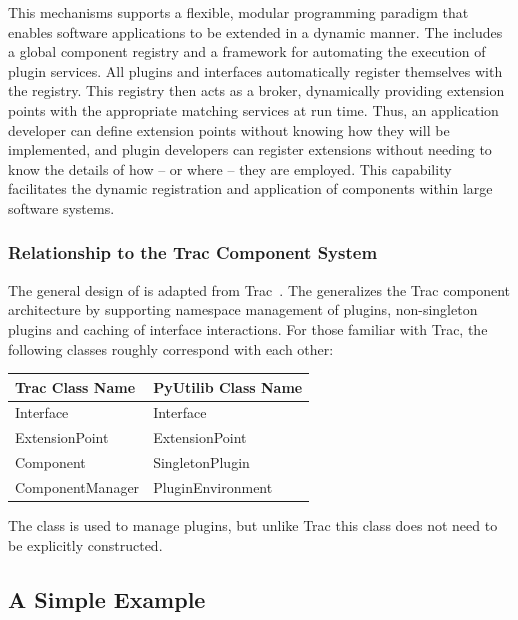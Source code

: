 This mechanisms supports a flexible,
modular programming paradigm that enables software applications to
be extended in a dynamic manner.  The \pcasp includes a global component
registry and a framework for automating the execution of plugin
services.  All plugins and interfaces automatically register themselves
with the registry.  This registry then acts as a broker, dynamically providing
extension points with the appropriate matching services at run time.  
Thus, an application
developer can define extension points without knowing how they will be
implemented, and plugin developers can register extensions without
needing to know the details of how -- or where -- they are employed.
This capability facilitates the dynamic registration
and application of components within large software systems.

\subsubsection{Relationship to the Trac Component System}

The general design of \pcasp is adapted from Trac~\cite{Trac}. The \pcasp
generalizes the Trac component architecture by supporting namespace
management of plugins, non-singleton plugins and caching of interface interactions. For those
familiar with Trac, the following classes roughly correspond with
each other:
\begin{center}
\begin{tabular}{|l|l|} \hline
    Trac Class Name &   PyUtilib Class Name \\ \hline
    Interface   & Interface \\
    ExtensionPoint  & ExtensionPoint \\
    Component   & SingletonPlugin \\
    ComponentManager    & PluginEnvironment \\ \hline
\end{tabular}
\end{center}
The  class is used to manage plugins, but unlike Trac this class does not   need to be explicitly constructed.


\subsection{A Simple Example}

